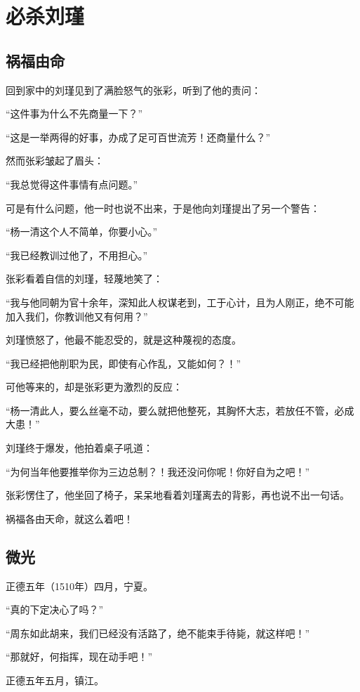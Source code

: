 \section{必杀刘瑾}
\ifnum{}
	\begin{multicols}{\theparacolNo}
		\fi
		\subsection{祸福由命}
		回到家中的刘瑾见到了满脸怒气的张彩，听到了他的责问：

		“这件事为什么不先商量一下？”

		“这是一举两得的好事，办成了足可百世流芳！还商量什么？”

		然而张彩皱起了眉头：

		“我总觉得这件事情有点问题。”

		可是有什么问题，他一时也说不出来，于是他向刘瑾提出了另一个警告：

		“杨一清这个人不简单，你要小心。”

		“我已经教训过他了，不用担心。”

		张彩看着自信的刘瑾，轻蔑地笑了：

		“我与他同朝为官十余年，深知此人权谋老到，工于心计，且为人刚正，绝不可能加入我们，你教训他又有何用？”

		刘瑾愤怒了，他最不能忍受的，就是这种蔑视的态度。

		“我已经把他削职为民，即使有心作乱，又能如何？！”

		可他等来的，却是张彩更为激烈的反应：

		“杨一清此人，要么丝毫不动，要么就把他整死，其胸怀大志，若放任不管，必成大患！”

		刘瑾终于爆发，他拍着桌子吼道：

		“为何当年他要推举你为三边总制？！我还没问你呢！你好自为之吧！”

		张彩愣住了，他坐回了椅子，呆呆地看着刘瑾离去的背影，再也说不出一句话。

		祸福各由天命，就这么着吧！

		\subsection{微光}
		正德五年（1510年）四月，宁夏。

		“真的下定决心了吗？”

		“周东如此胡来，我们已经没有活路了，绝不能束手待毙，就这样吧！”

		“那就好，何指挥，现在动手吧！”

		正德五年五月，镇江。


\end{multicols}
